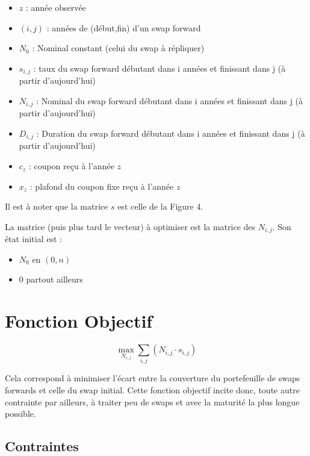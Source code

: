 \documentclass[12pt,a4paper]{report}
\begin{document}
\begin{itemize}\itemsep2pt
    \item $z$ : année observée
    \item $( i , j )$ : années de (début,fin) d'un swap forward
    \item $N_0$ : Nominal constant (celui du swap à répliquer)
    \item $s_{i,j}$ : taux du swap forward débutant dans i années et finissant dans j (à partir d'aujourd'hui)
    \item $N_{i,j}$ : Nominal du swap forward débutant dans i années et finissant dans j (à partir d'aujourd'hui)
    \item $D_{i,j}$ : Duration du swap forward débutant dans i années et finissant dans j (à partir d'aujourd'hui)
    \item $c_z$ : coupon reçu à l'année $z$
    \item $x_z$ : plafond du coupon fixe reçu à l'année $z$
\end{itemize}

Il est à noter que la matrice $s$ est celle de la Figure 4. 

La matrice (puis plus tard le vecteur) à optimiser est la matrice des $N_{i,j}$. Son état initial est :  
\begin{itemize}\itemsep2pt
    \item $N_0$ en $(0,n) $
    \item 0 partout ailleurs
\end{itemize}


\section{Fonction Objectif}



\[ \max_{N_{i,j}}  \sum_{i,j} ( N_{i,j} \cdot  s_{i,j} )  \]


Cela correspond à minimiser l'écart entre la couverture du portefeuille de swaps forwards et celle du swap initial.  Cette fonction objectif incite donc, toute autre contrainte par ailleurs, à  traiter peu de swaps et avec la maturité la plus longue possible.

\subsection{Contraintes}
\end{document}
